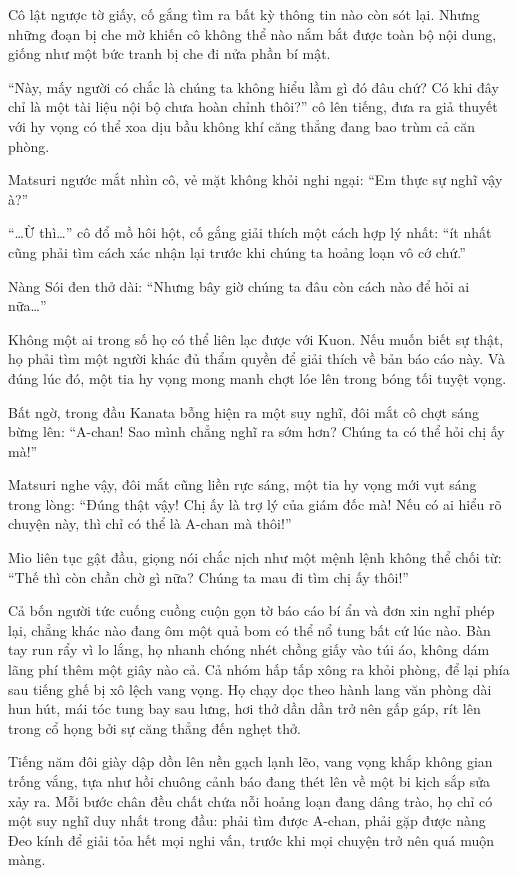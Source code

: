 \documentclass[../main.tex]{subfiles}
\begin{document}
Cô lật ngược tờ giấy, cố gắng tìm ra bất kỳ thông tin nào còn sót lại. Nhưng những đoạn bị che mờ khiến cô không thể nào nắm bắt được toàn bộ nội dung, giống như một bức tranh bị che đi nửa phần bí mật.

``Này, mấy người có chắc là chúng ta không hiểu lầm gì đó đâu chứ? Có khi đây chỉ là một tài liệu nội bộ chưa hoàn chỉnh thôi?'' cô lên tiếng, đưa ra giả thuyết với hy vọng có thể xoa dịu bầu không khí căng thẳng đang bao trùm cả căn phòng.

Matsuri ngước mắt nhìn cô, vẻ mặt không khỏi nghi ngại: ``Em thực sự nghĩ vậy à?''

``\dots Ừ thì\dots'' cô đổ mồ hôi hột, cố gắng giải thích một cách hợp lý nhất: ``ít nhất cũng phải tìm cách xác nhận lại trước khi chúng ta hoảng loạn vô cớ chứ.''

Nàng Sói đen thở dài: ``Nhưng bây giờ chúng ta đâu còn cách nào để hỏi ai nữa\dots''

Không một ai trong số họ có thể liên lạc được với Kuon. Nếu muốn biết sự thật, họ phải tìm một người khác đủ thẩm quyền để giải thích về bản báo cáo này. Và đúng lúc đó, một tia hy vọng mong manh chợt lóe lên trong bóng tối tuyệt vọng.

Bất ngờ, trong đầu Kanata bỗng hiện ra một suy nghĩ, đôi mắt cô chợt sáng bừng lên: ``A-chan! Sao mình chẳng nghĩ ra sớm hơn? Chúng ta có thể hỏi chị ấy mà!''

Matsuri nghe vậy, đôi mắt cũng liền rực sáng, một tia hy vọng mới vụt sáng trong lòng: ``Đúng thật vậy! Chị ấy là trợ lý của giám đốc mà! Nếu có ai hiểu rõ chuyện này, thì chỉ có thể là A-chan mà thôi!''

Mio liên tục gật đầu, giọng nói chắc nịch như một mệnh lệnh không thể chối từ: ``Thế thì còn chần chờ gì nữa? Chúng ta mau đi tìm chị ấy thôi!''

Cả bốn người tức cuống cuồng cuộn gọn tờ báo cáo bí ẩn và đơn xin nghỉ phép lại, chẳng khác nào đang ôm một quả bom có thể nổ tung bất cứ lúc nào. Bàn tay run rẩy vì lo lắng, họ nhanh chóng nhét chồng giấy vào túi áo, không dám lãng phí thêm một giây nào cả. Cả nhóm hấp tấp xông ra khỏi phòng, để lại phía sau tiếng ghế bị xô lệch vang vọng. Họ chạy dọc theo hành lang văn phòng dài hun hút, mái tóc tung bay sau lưng, hơi thở dần dần trở nên gấp gáp, rít lên trong cổ họng bởi sự căng thẳng đến nghẹt thở.

Tiếng năm đôi giày dập dồn lên nền gạch lạnh lẽo, vang vọng khắp không gian trống vắng, tựa như hồi chuông cảnh báo đang thét lên về một bi kịch sắp sửa xảy ra. Mỗi bước chân đều chất chứa nỗi hoảng loạn đang dâng trào, họ chỉ có một suy nghĩ duy nhất trong đầu: phải tìm được A-chan, phải gặp được nàng Đeo kính để giải tỏa hết mọi nghi vấn, trước khi mọi chuyện trở nên quá muộn màng.
\end{document}
